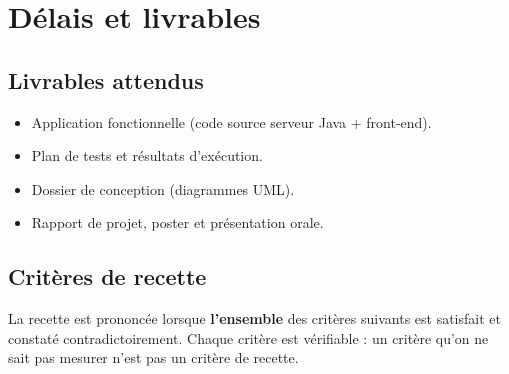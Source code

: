 \chapter{Délais et livrables}
\label{chap:delais}

\section{Livrables attendus}
\begin{itemize}
  \item Application fonctionnelle (code source serveur Java + front-end).
  \item Plan de tests et résultats d'exécution.
  \item Dossier de conception (diagrammes UML).
  \item Rapport de projet, poster et présentation orale.
\end{itemize}

\section{Critères de recette}
La recette est prononcée lorsque \textbf{l'ensemble} des critères suivants est
satisfait et constaté contradictoirement. Chaque critère est vérifiable :
un critère qu'on ne sait pas mesurer n'est pas un critère de recette.

